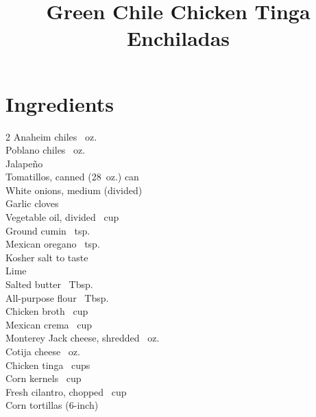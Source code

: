 \documentclass[11pt,letterpaper]{article}
\title{Green Chile Chicken Tinga Enchiladas}
\author{}
\date{}
\begin{document}
\maketitle
\thispagestyle{empty}


\section*{Ingredients}
\setlength{\columnsep}{20pt}
\begin{multicols}{2}
\noindent
    Anaheim chiles ~oz. \\
    Poblano chiles ~oz. \\
    Jalapeño  \\
    Tomatillos, canned  (28~oz.) can \\
    White onions, medium (divided)  \\
    Garlic cloves  \\
    Vegetable oil, divided \dotfill {}~cup \\
    Ground cumin ~tsp. \\
    Mexican oregano ~tsp. \\
    Kosher salt \dotfill to taste \\
    Lime  \\
    \columnbreak
    Salted butter ~Tbsp. \\
    All-purpose flour ~Tbsp. \\
    Chicken broth ~cup \\
    Mexican crema \dotfill {}~cup \\
    Monterey Jack cheese, shredded ~oz. \\
    Cotija cheese ~oz. \\
    Chicken tinga ~cups \\
    Corn kernels ~cup \\
    Fresh cilantro, chopped \dotfill {}~cup \\
    Corn tortillas (6-inch)  \\
\end{multicols}
\end{document}
